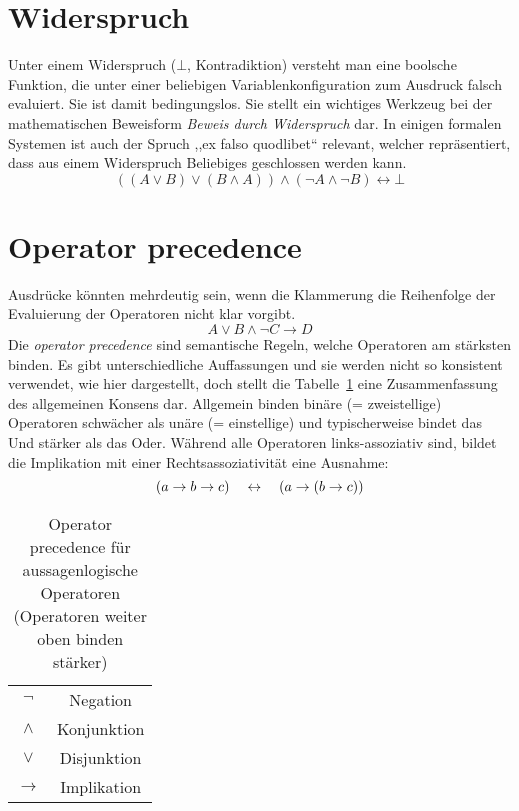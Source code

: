 \section{Widerspruch}
%
Unter einem Widerspruch ($\bot$, Kontradiktion) versteht man eine boolsche Funktion, die unter einer beliebigen Variablenkonfiguration zum Ausdruck falsch evaluiert. Sie ist damit bedingungslos. Sie stellt ein wichtiges Werkzeug bei der mathematischen Beweisform \emph{Beweis durch Widerspruch} dar. In einigen formalen Systemen ist auch der Spruch ,,ex falso quodlibet`` relevant, welcher repräsentiert, dass aus einem Widerspruch Beliebiges geschlossen werden kann.
%
\begin{equation}
  ((A \lor B) \lor (B \land A)) \land (\neg A \land \neg B) \leftrightarrow \bot
\end{equation}

\section{Operator precedence}
%
Ausdrücke könnten mehrdeutig sein, wenn die Klammerung die Reihenfolge der Evaluierung der Operatoren nicht klar vorgibt.
%
\[
  A \lor B \land \neg C \rightarrow D
\]
%
Die \emph{operator precedence} sind semantische Regeln, welche Operatoren am stärksten binden. Es gibt unterschiedliche Auffassungen und sie werden nicht so konsistent verwendet, wie hier dargestellt, doch stellt die Tabelle~\ref{tab:op_precedence} eine Zusammenfassung des allgemeinen Konsens dar. Allgemein binden binäre (= zweistellige) Operatoren schwächer als unäre (= einstellige) und typischerweise bindet das Und stärker als das Oder. Während alle Operatoren links-assoziativ sind, bildet die Implikation mit einer Rechtsassoziativität eine Ausnahme:
\begin{equation}
  (a \rightarrow b \rightarrow c) \quad\leftrightarrow\quad (a \rightarrow (b \rightarrow c))
\end{equation}

\begin{table}[ht]
 \begin{center}
  \begin{tabular}{cc}
   $\neg$        & Negation \\
   $\land$       & Konjunktion \\
   $\lor$        & Disjunktion \\
   $\rightarrow$ & Implikation
  \end{tabular}
  \caption{Operator precedence für aussagenlogische Operatoren
           (Operatoren weiter oben binden stärker)}
  \label{tab:op_precedence}
 \end{center}
\end{table}


